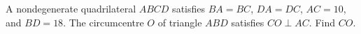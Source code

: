 A nondegenerate quadrilateral $ABCD$ satisfies $BA=BC$, $DA=DC$, $AC=10$, and $BD=18$. The circumcentre $O$ of triangle $ABD$ satisfies $CO\perp AC$. Find $CO$.
